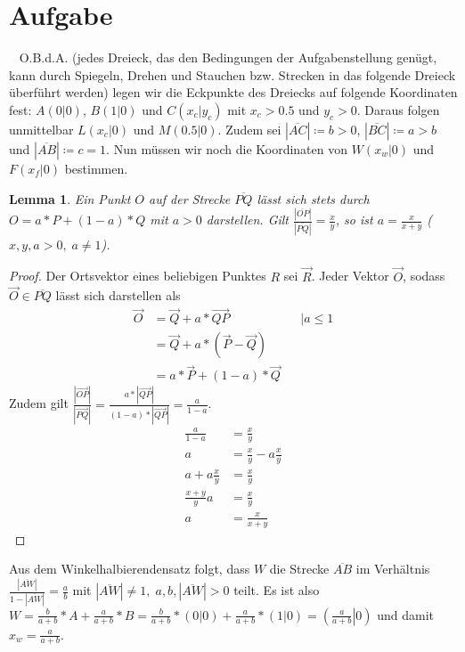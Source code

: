 \documentclass{article}
\newtheorem{lemma}{Lemma}
\newcommand{\strecke}[1]{\left|\overline{#1}\right|}
\begin{document}
    \section{Aufgabe}
    \ \newline
    O.B.d.A. (jedes Dreieck, das den Bedingungen der Aufgabenstellung genügt, kann durch Spiegeln, Drehen und Stauchen bzw. Strecken in das folgende Dreieck überführt werden) legen wir die Eckpunkte des Dreiecks auf folgende Koordinaten fest: $A(0|0)$, $B(1|0)$ und $C(x_c|y_c)$ mit $x_c> 0.5$ und $y_c> 0$. Daraus folgen unmittelbar $L(x_c|0)$ und $M(0.5|0)$. Zudem sei $\strecke{AC}\coloneqq b>0$, $\strecke{BC}\coloneqq a>b$ und $\strecke{AB}\coloneqq c = 1$.
    Nun müssen wir noch die Koordinaten von $W(x_w|0)$ und $F(x_f|0)$ bestimmen.
    \begin{lemma}
    	Ein Punkt $O$ auf der Strecke $\overline{PQ}$ lässt sich stets durch $O = a*P+(1-a)*Q$ mit $a>0$ darstellen.
    	Gilt $\frac{\strecke{OP}}{\strecke{PQ}} = \frac{x}{y}$, so ist $a = \frac{x}{x+y}$ ($x, y, a>0,\; a \neq 1$).
    \end{lemma}
	\begin{proof}
		Der Ortsvektor eines beliebigen Punktes $R$ sei $\vec{R}$. Jeder Vektor $\vec{O}$, sodass $\vec{O}\in \overline{PQ}$ lässt sich darstellen als 
		\begin{align*}
			\vec{O}&= \vec{Q} + a*\vec{QP}&&| a\leq 1\\
			&= \vec{Q} + a* (\vec{P} - \vec{Q})\\
			&= a*\vec{P}+(1-a)*\vec{Q}
		\end{align*}
		Zudem gilt $\frac{|\vec{OP}|}{|\vec{PQ}|} = \frac{a*|\vec{QP}|}{(1-a)*|\vec{QP}|} = \frac{a}{1-a}$.
		\begin{align*}
			\frac{a}{1-a} &= \frac{x}{y}\\
			a &= \frac{x}{y}- a\frac{x}{y}\\
			a + a\frac{x}{y}&=  \frac{x}{y}\\
			\frac{x+y}{y}a &= \frac{x}{y}\\
			a &= \frac{x}{x+y}
		\end{align*}
	\end{proof}
	\noindent Aus dem Winkelhalbierendensatz folgt, dass $W$ die Strecke $\overline{AB}$ im Verhältnis $\frac{\strecke{AW}}{1-\strecke{AW}} = \frac{a}{b}$ mit $\strecke{AW} \neq 1,\; a,b, \strecke{AW}>0$ teilt.
	Es ist also $W = \frac{b}{a+b}*A + \frac{a}{a+b}*B = \frac{b}{a+b}*(0|0) + \frac{a}{a+b}*(1|0) = \left(\left.\frac{a}{a+b}\right|0\right)$ und damit $x_w = \frac{a}{a+b}$.
\end{document}
